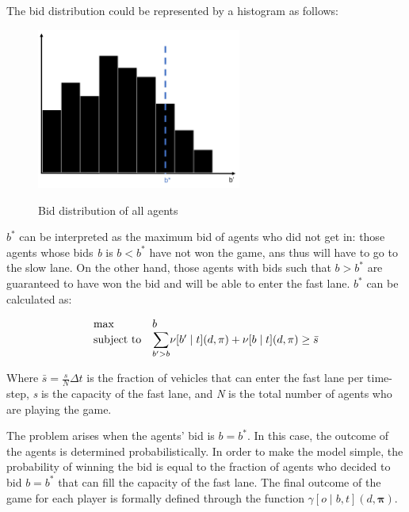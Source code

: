 \documentclass[a4paper,11pt,twoside]{book}
\begin{document}
The bid distribution could be represented by a histogram as follows:

\begin{figure}[H]
    \centering
    \includegraphics[width=0.6\textwidth]{reporttemplate/graphics/bid_distribution.png}\\
    \caption{Bid distribution of all agents}\label{fig:bid_distribution}
\end{figure}

$b^*$ can be interpreted as the maximum bid of agents who did not get in: those agents whose bids \textit{b} is $b<b^*$ have not won the game, ans thus will have to go to the slow lane. On the other hand, those agents with bids such that $b>b^*$ are guaranteed to have won the bid and will be able to enter the fast lane. $b^*$ can be calculated as:

\begin{equation}
    \begin{array}{ll@{}ll}
        \text{max}  & b &\\
        \text{subject to}& \displaystyle\sum\limits_{b'>b}   &\nu[b'\mid t](d,\pi) + \nu[b\mid t](d,\pi) \geq \bar{s}
    \end{array}
\end{equation}

Where \(\bar{s} = \frac{s}{N} \Delta t\) is the fraction of vehicles that can enter the fast lane per time-step, \textit{s} is the capacity of the fast lane, and \textit{N} is the total number of agents who are playing the game.

The problem arises when the agents' bid is $b=b^*$. In this case, the outcome of the agents is determined probabilistically. In order to make the model simple, the probability of winning the bid is equal to the fraction of agents who decided to bid $b=b^*$ that can fill the capacity of the fast lane. The final outcome of the game for each player is formally defined through the function $\gamma[o \mid b,t](d,\bm{\pi})$.
\end{document}
